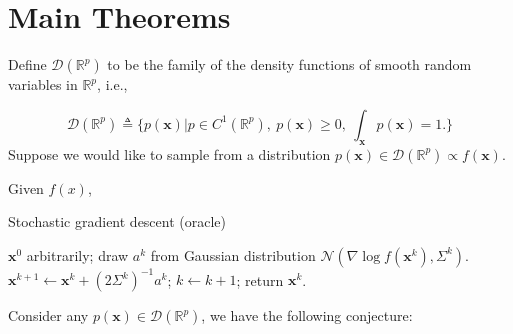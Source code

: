 \documentclass[preprint,12pt,3p]{elsarticle}
\newcommand{\bx}{\mathbf{x}}
\newcommand{\R}{\mathbb{R}}
\newcommand{\D}{\mathscr{D}}
\newcommand{\N}{\mathscr{N}}
\begin{document}
\section{Main Theorems}

Define $\D(\R^p)$ to be the family of the density functions of smooth random variables in $\R^p$, i.e.,

\begin{equation}
\D(\R^p)\triangleq \{p(\bx)\Big| p\in C^1(\R^p),~p(\bx) \geq 0,~ \int_\bx p(\bx) = 1.\}
\end{equation}
Suppose we would like to sample from a distribution $p(\bx)\in \D(\R^p) \propto f(\bx)$. 
\begin{algorithm}[H]
{\small
Given $f(x)$, 
\begin{algorithmic}\caption{Stochastic gradient descent (oracle)}\label{Alg:SGD}
 $ \bx^0$ arbitrarily;
\STATE draw $a^k$ from Gaussian distribution $\N(\nabla \log f(\bx^k), \Sigma^{k})$.
\STATE
$\bx^{k+1} \gets \bx^k + (2\Sigma^k)^{-1} a^k$;
\STATE $k\gets k+1$;
\ENDWHILE
\STATE return $\bx^k$.
\end{algorithmic}}
\end{algorithm}


Consider any $p(\bx)\in \D(\R^p)$, we have the following conjecture:
\end{document}
